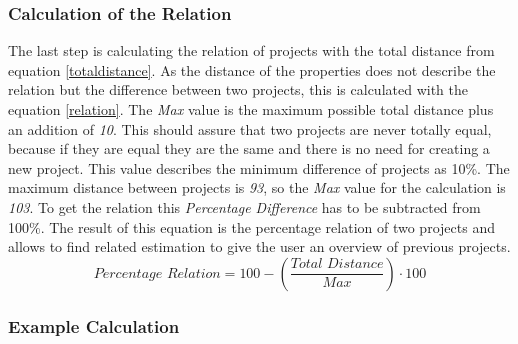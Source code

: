 \subsubsection{\textbf{ Calculation of the Relation}}
The last step is calculating the relation of projects with the total distance from equation \ref{totaldistance}. As the distance of the properties does not describe the relation but the difference between two projects, this is calculated with the equation \ref{relation}. The \textit{Max} value is the maximum possible total distance plus an addition of \textit{10}. This should assure that two projects are never totally equal, because if they are equal they are the same and there is no need for creating a new project. This value describes the minimum difference of projects as 10\%. The maximum distance between projects is \textit{93}, so the \textit{Max} value for the calculation is \textit{103}. To get the relation this \textit{Percentage Difference} has to be subtracted from 100\%. The result of this equation is the percentage relation of two projects and allows to find related estimation to give the user an overview of previous projects.\\
\begin{equation}
\textit{Percentage Relation} =  100 - (\frac{\textit{Total Distance}}{\textit{Max}})\cdot 100\label{relation}
\end{equation}
\subsubsection{\textbf{Example Calculation}}


